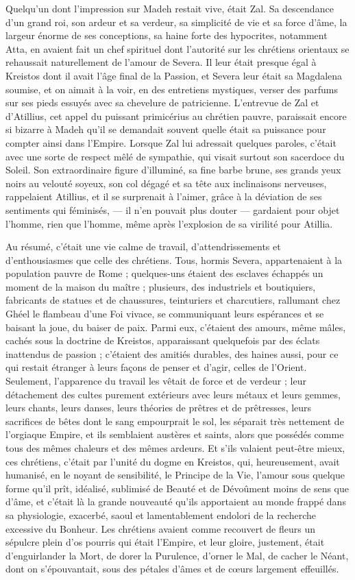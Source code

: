 \documentclass[a4paper, 11pt, oneside, polutonikogreek, french]{article}
\begin{document}
Quelqu'un dont l'impression sur Madeh restait vive, était Zal. Sa descendance d'un grand roi, son ardeur et sa verdeur, sa simplicité de vie et sa force d'âme, la largeur énorme de ses conceptions, sa haine forte des hypocrites, notamment Atta, en avaient fait un chef spirituel dont l'autorité sur les chrétiens orientaux se rehaussait naturellement de l'amour de Severa. Il leur était presque égal à Kreistos dont il avait l'âge final de la Passion, et Severa leur était sa Magdalena soumise, et on aimait à la voir, en des entretiens mystiques, verser des parfums sur ses pieds essuyés avec sa chevelure de patricienne. L'entrevue de Zal et d'Atillius, cet appel du puissant primicérius au chrétien pauvre, paraissait encore si bizarre à Madeh qu'il se demandait souvent quelle était sa puissance pour compter ainsi dans l'Empire. Lorsque Zal lui adressait quelques paroles, c'était avec une sorte de respect mêlé de sympathie, qui visait surtout son sacerdoce du Soleil. Son extraordinaire figure d'illuminé, sa fine barbe brune, ses grands yeux noirs au velouté soyeux, son col dégagé et sa tête aux inclinaisons nerveuses, rappelaient Atillius, et il se surprenait à l'aimer, grâce à la déviation de ses sentiments qui féminisés, --- il n'en pouvait plus douter --- gardaient pour objet l'homme, rien que l'homme, même après l'explosion de sa virilité pour Atillia.

Au résumé, c'était une vie calme de travail, d'attendrissements et d'enthousiasmes que celle des chrétiens. Tous, hormis Severa, appartenaient à la population pauvre de Rome ; quelques-uns étaient des esclaves échappés un moment de la maison du maître ; plusieurs, des industriels et boutiquiers, fabricants de statues et de chaussures, teinturiers et charcutiers, rallumant chez Ghéel le flambeau d'une Foi vivace, se communiquant leurs espérances et se baisant la joue, du baiser de paix. Parmi eux, c'étaient des amours, même mâles, cachés sous la doctrine de Kreistos, apparaissant quelquefois par des éclats inattendus de passion ; c'étaient des amitiés durables, des haines aussi, pour ce qui restait étranger à leurs façons de penser et d'agir, celles de l'Orient. Seulement, l'apparence du travail les vêtait de force et de verdeur ; leur détachement des cultes purement extérieurs avec leurs métaux et leurs gemmes, leurs chants, leurs danses, leurs théories de prêtres et de prêtresses, leurs sacrifices de bêtes dont le sang empourprait le sol, les séparait très nettement de l'orgiaque Empire, et ils semblaient austères et saints, alors que possédés comme tous des mêmes chaleurs et des mêmes ardeurs. Et s'ils valaient peut-être mieux, ces chrétiens, c'était par l'unité du dogme en Kreistos, qui, heureusement, avait humanisé, en le noyant de sensibilité, le Principe de la Vie, l'amour sous quelque forme qu'il prît, idéalisé, sublimisé de Beauté et de Dévoûment moins de sens que d'âme, et c'était là la grande nouveauté qu'ils apportaient au monde frappé dans sa physiologie, exacerbé, saoul et lamentablement endolori de la recherche excessive du Bonheur. Les chrétiens avaient comme recouvert de fleurs un sépulcre plein d'os pourris qui était l'Empire, et leur gloire, justement, était d'enguirlander la Mort, de dorer la Purulence, d'orner le Mal, de cacher le Néant, dont on s'épouvantait, sous des pétales d'âmes et de cœurs largement effeuillés.
\clearpage
\end{document}
